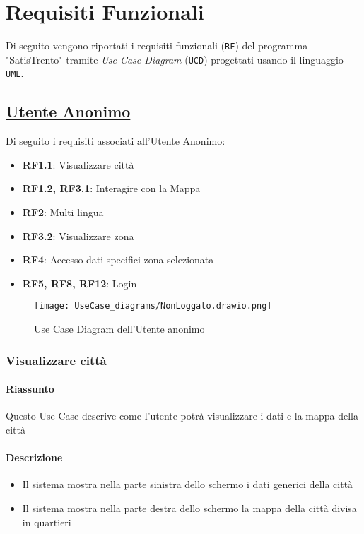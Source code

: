 \chapter{Requisiti Funzionali}
\label{ch:requisitiFunzionali}

Di seguito vengono riportati i requisiti funzionali (\texttt{RF}) del programma "SatisTrento" tramite \textit{Use Case Diagram} (\texttt{UCD}) progettati usando il linguaggio \texttt{UML}.

\section{\underline{Utente Anonimo}}
    Di seguito i requisiti associati all'Utente Anonimo:
    \begin{itemize}
        \item \textbf{RF1.1}: Visualizzare città
        \item \textbf{RF1.2, RF3.1}: Interagire con la Mappa
        \item \textbf{RF2}: Multi lingua
        \item \textbf{RF3.2}: Visualizzare zona
        \item \textbf{RF4}: Accesso dati specifici zona selezionata
        \item \textbf{RF5, RF8, RF12}: Login
    \end{itemize}
    \begin{figure}[H]
        \centering
        \texttt{[image: UseCase\_diagrams/NonLoggato.drawio.png]}
        \caption{Use Case Diagram dell'Utente anonimo}
    \end{figure}

    \subsection{Visualizzare città}
        \subsubsection{Riassunto}
            Questo Use Case descrive come l'utente potrà visualizzare i dati e la mappa della città
        \subsubsection{Descrizione}
            \begin{itemize}
                \item Il sistema mostra nella parte sinistra dello schermo i dati generici della città
                \item Il sistema mostra nella parte destra dello schermo la mappa della città divisa in quartieri
            \end{itemize}
    
